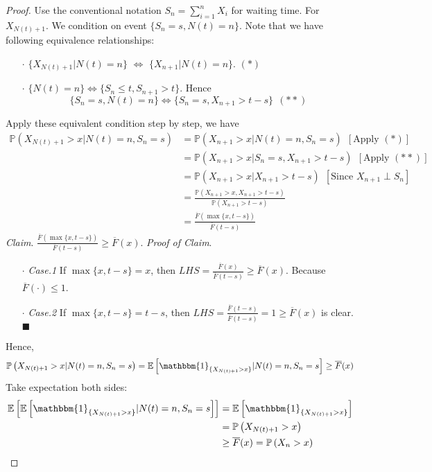 \documentclass[a4paper, 10pt]{article}
\theoremstyle{definition}
\theoremstyle{hSol}
\begin{document}
\begin{proof} Use the conventional notation $S_n=\sum_{i=1}^n X_i$ for waiting time. For $X_{N(t)+1}$. We condition on event $\{S_n=s, N(t)=n\}$. Note that we have following equivalence relationships:
\begin{itemize}
  \item[$\cdot$] $\{X_{N(t)+1}|N(t)=n\}$ $\iff$ $\{X_{n+1}|N(t)=n\}$. $(*)$
  \item[$\cdot$] $\{N(t)=n\}\iff\{S_n\leq t, S_{n+1}>t\}$. Hence
  $$\{S_n=s, N(t)=n\} \iff \{S_n=s, X_{n+1}>t-s\}~~(**)$$
\end{itemize}
Apply these equivalent condition step by step, we have
\begin{equation}
  \begin{split}
    \mathbb{P}\left(X_{N(t)+1}>x|N(t)=n, S_n=s\right) &=  \mathbb{P}\left(X_{n+1}>x|N(t)=n, S_n=s\right)~~[\text{Apply } (*)]\\
    &= \mathbb{P}\left(X_{n+1}>x|S_n=s, X_{n+1}>t-s\right)~~[\text{Apply } (**)]\\
    &= \mathbb{P}\left(X_{n+1}>x|X_{n+1}>t-s\right)~~[\text{Since $X_{n+1}\perp S_n$}]\\
    &= \frac{\mathbb{P}\left(X_{n+1}>x, X_{n+1}>t-s\right)}{\mathbb{P}\left(X_{n+1}>t-s\right)}\\
    &= \frac{\overline{F}(\max\{x, t-s\})}{\overline{F}(t-s)}
  \end{split}
\end{equation}
\emph{Claim}. $\frac{\overline{F}(\max\{x, t-s\})}{\overline{F}(t-s)}\geq \overline{F}(x)$.
\emph{Proof of Claim}. 
\begin{itemize}
  \item[$\cdot$] \textit{Case.1} If $\max\{x, t-s\}=x$, then $LHS = \frac{\overline{F}(x)}{\overline{F}(t-s)}\geq \overline{F}(x)$. Because $\overline{F}(\cdot)\leq 1$.
  \item[$\cdot$] \textit{Case.2} If $\max\{x, t-s\}=t-s$, then $LHS = \frac{\overline{F}(t-s)}{\overline{F}(t-s)}=1\geq \overline{F}(x)$ is clear. $\blacksquare$
\end{itemize}
Hence, 
$$\mathbb{P}\left(X_{N(t)+1}>x|N(t)=n, S_n=s\right) =\mathbb{E}\left[\mathbbm{1}_{\{X_{N(t)+1}>x\}}|N(t)=n, S_n=s\right] \geq \overline{F}(x)$$
Take expectation both sides:
\begin{equation}
  \begin{split}
    \mathbb{E}\left[\mathbb{E}\left[\mathbbm{1}_{\{X_{N(t)+1}>x\}}|N(t)=n, S_n=s\right]\right] &= \mathbb{E}\left[\mathbbm{1}_{\{X_{N(t)+1}>x\}}\right]\\
    &= \mathbb{P}\left(X_{N(t)+1}>x\right) \\
    &\geq \overline{F}(x) = \mathbb{P}\left(X_n>x\right)
  \end{split}
\end{equation}
\end{proof}
\end{document}
